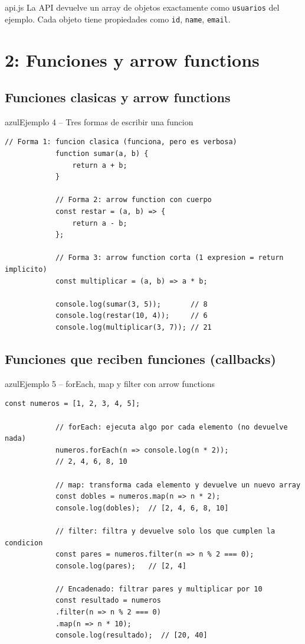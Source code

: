 \documentclass[11pt,a4paper]{article}
\begin{document}
	\begin{cajapractica}{api.js}
		La API devuelve un array de objetos exactamente como \texttt{usuarios} del ejemplo. Cada objeto tiene propiedades como \texttt{id}, \texttt{name}, \texttt{email}.
	\end{cajapractica}
	
	\section{2: Funciones y arrow functions}
	
	\subsection{Funciones clasicas y arrow functions}
	
	\begin{cajacodigo}{azul}{Ejemplo 4 -- Tres formas de escribir una funcion}
		\begin{lstlisting}[style=codejs]
			// Forma 1: funcion clasica (funciona, pero es verbosa)
			function sumar(a, b) {
				return a + b;
			}
			
			// Forma 2: arrow function con cuerpo
			const restar = (a, b) => {
				return a - b;
			};
			
			// Forma 3: arrow function corta (1 expresion = return implicito)
			const multiplicar = (a, b) => a * b;
			
			console.log(sumar(3, 5));       // 8
			console.log(restar(10, 4));     // 6
			console.log(multiplicar(3, 7)); // 21
		\end{lstlisting}
	\end{cajacodigo}
	
	\subsection{Funciones que reciben funciones (callbacks)}
	
	\begin{cajacodigo}{azul}{Ejemplo 5 -- forEach, map y filter con arrow functions}
		\begin{lstlisting}[style=codejs]
			const numeros = [1, 2, 3, 4, 5];
			
			// forEach: ejecuta algo por cada elemento (no devuelve nada)
			numeros.forEach(n => console.log(n * 2));
			// 2, 4, 6, 8, 10
			
			// map: transforma cada elemento y devuelve un nuevo array
			const dobles = numeros.map(n => n * 2);
			console.log(dobles);  // [2, 4, 6, 8, 10]
			
			// filter: filtra y devuelve solo los que cumplen la condicion
			const pares = numeros.filter(n => n % 2 === 0);
			console.log(pares);   // [2, 4]
			
			// Encadenado: filtrar pares y multiplicar por 10
			const resultado = numeros
			.filter(n => n % 2 === 0)
			.map(n => n * 10);
			console.log(resultado);  // [20, 40]
		\end{lstlisting}
	\end{cajacodigo}
	
\end{document}
